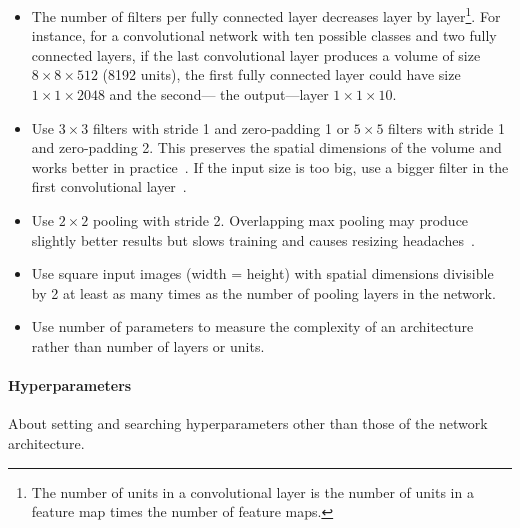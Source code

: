 \begin{itemize}
	\item The number of filters per fully connected layer decreases layer by layer\footnote{The number of units in a convolutional layer is the number of units in a feature map times the number of feature maps.}. For instance, for a convolutional network with ten possible classes and two fully connected layers, if the last convolutional layer produces a volume of size $8 \times 8 \times 512$ (8192 units), the first fully connected layer could have size $1 \times 1 \times 2048$ and the second--- the output---layer $1\times 1\times 10$.

	\item Use $3\times 3$ filters with stride 1 and zero-padding 1 or $5 \times 5$ filters with stride 1 and zero-padding 2. This preserves the spatial dimensions of the volume and works better in practice~\cite{Springenberg2014}. If the input size is too big, use a bigger filter in the first convolutional layer~\cite{Karpathy2016}.
	
	\item Use $2\times2$ pooling with stride 2. Overlapping max pooling may produce slightly better results but slows training and causes resizing headaches~\cite{Krizhevsky2012, Dieleman2015}.
	\item Use square input images (width = height) with spatial dimensions divisible by 2 at least as many times as the number of pooling layers in the network.

	\item Use number of parameters to measure the complexity of an architecture rather than number of layers or units.
\end{itemize}



\paragraph{Hyperparameters} About setting and searching hyperparameters other than those of the network architecture.

